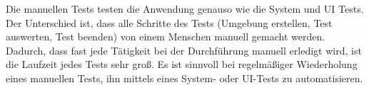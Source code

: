 Die manuellen Tests testen die Anwendung genauso wie die System und UI Tests. 
Der Unterschied ist, dass alle Schritte des Tests (Umgebung erstellen, Test auswerten, Test beenden) von einem Menschen manuell gemacht werden.
Dadurch, dass fast jede Tätigkeit bei der Durchführung manuell erledigt wird, ist die Laufzeit jedes Tests sehr groß.
Es ist sinnvoll bei regelmäßiger Wiederholung eines manuellen Tests, ihn mittels eines System- oder UI-Tests zu automatisieren.